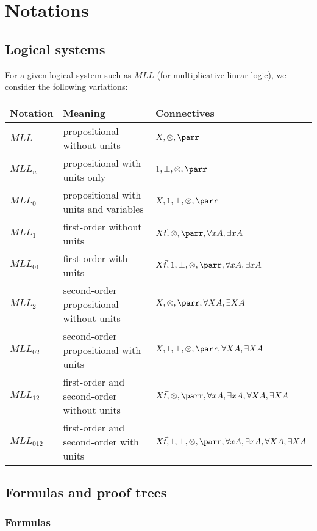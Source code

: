 \chapter{Notations}\label{notations}

\section{Logical systems}\label{logical-systems}

For a given logical system such as $MLL$ (for
multiplicative linear logic), we consider the following variations:
\begin{center}
\begin{tabular}{lll}
\hline
Notation & Meaning & Connectives\\
\hline
$MLL$ &
propositional without units &
$X,{\tens},{\parr}$\\
$MLL_u$ &
propositional with units only &
$\one,\bot,{\tens},{\parr}$\\
$MLL_0$ &
propositional with units and variables &
$X,\one,\bot,{\tens},{\parr}$\\
$MLL_1$ &
first-order without units &
$X\vec{t},{\tens},{\parr},\forall
x A,\exists x
A$\\
$MLL_{01}$ &
first-order with units &
$X\vec{t},\one,\bot,{\tens},{\parr},\forall
x A,\exists x
A$\\
$MLL_2$ &
second-order propositional without units &
$X,{\tens},{\parr},\forall
X A,\exists X
A$\\
$MLL_{02}$ &
second-order propositional with units &
$X,\one,\bot,{\tens},{\parr},\forall
X A,\exists X
A$\\
$MLL_{12}$ &
first-order and second-order without units &
$X\vec{t},{\tens},{\parr},\forall
x A,\exists x A,\forall X
A,\exists X
A$\\
$MLL_{012}$
& first-order and second-order with units &
$X\vec{t},\one,\bot,{\tens},{\parr},\forall x A,\exists x A,\forall X A,\exists X A$\\
\hline
\end{tabular}
\end{center}

\section{Formulas and proof trees}\label{formulas-and-proof-trees}

\subsection{Formulas}

